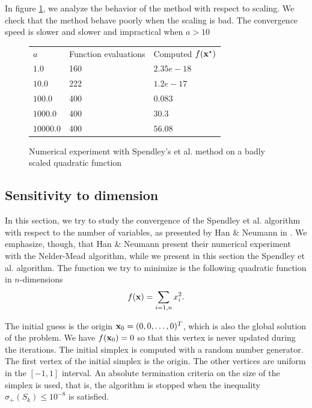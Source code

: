 In figure \ref{fig-spendley-numexp2-scaling}, we analyze the 
behavior of the method with respect to scaling.
We check that the method behave poorly when the scaling is 
bad. The convergence speed is slower and slower and impractical 
when $a>10$

\begin{figure}[htbp]
\begin{center}
\begin{tabular}{|l|l|l|}
\hline
$a$ & Function evaluations & Computed $f(\mathbf{x}^\star)$ \\
$1.0$ & 160 & $2.35e-18$ \\
$10.0$ & 222 & $1.2e-17$ \\
$100.0$ & 400 & $0.083$ \\
$1000.0$ & 400 & $30.3$ \\
$10000.0$ & 400 & $56.08$ \\
\hline
\end{tabular}
\end{center}
\caption{Numerical experiment with Spendley's et al. method on a badly scaled quadratic function}
\label{fig-spendley-numexp2-scaling}
\end{figure}

\subsection{Sensitivity to dimension}

In this section, we try to study the convergence of the 
Spendley et al. algorithm with respect to the number of variables,
as presented by Han \& Neumann in \cite{HanNeumann2006}.
We emphasize, though, that Han \& Neumann present their numerical 
experiment with the Nelder-Mead algorithm, while we present 
in this section the Spendley et al. algorithm.
The function we try to minimize is the following quadratic function 
in $n$-dimensions 
\begin{eqnarray}
\label{quadratic-sp-function3}
f(\mathbf{x}) = \sum_{i=1,n} x_i^2.
\end{eqnarray}

The initial guess is the origin $\mathbf{x}_0 = (0,0,\ldots,0)^T$,
which is also the global solution of the problem.
We have $f(\mathbf{x}_0)=0$ so that this vertex is never updated 
during the iterations.
The initial simplex is computed with a random number generator.
The first vertex of the initial simplex is the origin.
The other vertices are uniform in the $[-1,1]$ interval.
An absolute termination criteria on the size of the simplex is used, 
that is, the algorithm is stopped when the inequality 
$\sigma_+(S_k) \leq 10^{-8}$ is satisfied.

